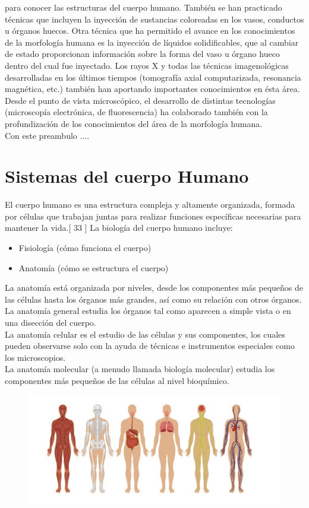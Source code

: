para conocer las estructuras del cuerpo humano. También se han practicado técnicas que incluyen la inyección de sustancias coloreadas en los vasos, conductos u órganos huecos. 
Otra técnica que ha permitido el avance en los conocimientos de la morfología humana es la inyección de líquidos solidificables, que al cambiar de estado proporcionan información 
sobre la forma del vaso u órgano hueco dentro del cual fue inyectado. Los rayos X y todas las técnicas imagenológicas desarrolladas en los últimos tiempos 
(tomografía axial computarizada, resonancia magnética, etc.) también han aportando importantes conocimientos en ésta área.\\
Desde el punto de vista microscópico, el desarrollo de distintas tecnologías (microscopía electrónica, de fluorescencia) ha colaborado también con la profundización de los 
conocimientos del área de la morfología humana.\\
Con este preambulo ....

\section{Sistemas del cuerpo Humano}
El cuerpo humano es una estructura compleja y altamente organizada, formada por células que trabajan juntas para realizar funciones específicas necesarias 
para mantener la vida.[ 33 ] La biología del cuerpo humano incluye:
\begin{itemize}
	\item Fisiología (cómo funciona el cuerpo) %
	\item Anatomía (cómo se estructura el cuerpo)	
\end{itemize}
La anatomía está organizada por niveles, desde los componentes más pequeños de las células hasta los órganos más grandes, así como su relación con otros órganos.\\
La anatomía general estudia los órganos tal como aparecen a simple vista o en una disección del cuerpo.\\
La anatomía celular es el estudio de las células y sus componentes, los cuales pueden observarse solo con la ayuda de técnicas e instrumentos especiales como los microscopios.\\
La anatomía molecular (a menudo llamada biología molecular) estudia los componentes más pequeños de las células al nivel bioquímico.\\
\begin{figure}[H]
	\begin{center}
 		\includegraphics[width = .7\textwidth]{source/images/image22.png}
	\end{center} 
\end{figure}

